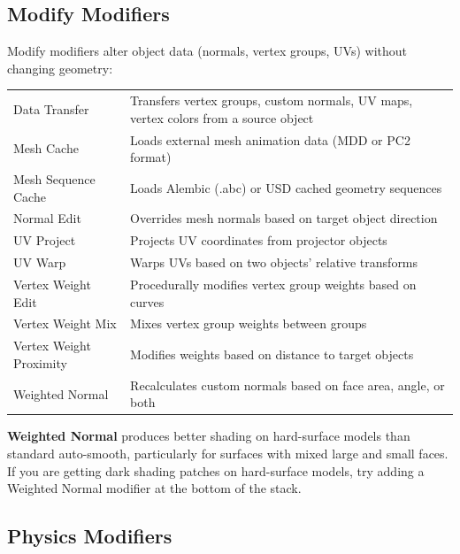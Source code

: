 \subsection{Modify Modifiers}
\label{sec:modifymod}

Modify modifiers alter object data (normals, vertex groups, UVs) without changing geometry:

\begin{center}
\begin{tabularx}{\textwidth}{L{3.5cm}X}
\toprule
{}
 &  \\
\midrule
Data Transfer & Transfers vertex groups, custom normals, UV maps, vertex colors from a source object \\
Mesh Cache & Loads external mesh animation data (MDD or PC2 format) \\
Mesh Sequence Cache & Loads Alembic (.abc) or USD cached geometry sequences \\
Normal Edit & Overrides mesh normals based on target object direction \\
UV Project & Projects UV coordinates from projector objects \\
UV Warp & Warps UVs based on two objects' relative transforms \\
Vertex Weight Edit & Procedurally modifies vertex group weights based on curves \\
Vertex Weight Mix & Mixes vertex group weights between groups \\
Vertex Weight Proximity & Modifies weights based on distance to target objects \\
Weighted Normal & Recalculates custom normals based on face area, angle, or both \\
\bottomrule
\end{tabularx}
\end{center}

\begin{tipbox}
\textbf{Weighted Normal} produces better shading on hard-surface models than standard auto-smooth, particularly for surfaces with mixed large and small faces. If you are getting dark shading patches on hard-surface models, try adding a Weighted Normal modifier at the bottom of the stack.
\end{tipbox}

\subsection{Physics Modifiers}
\label{sec:physicsmod}

